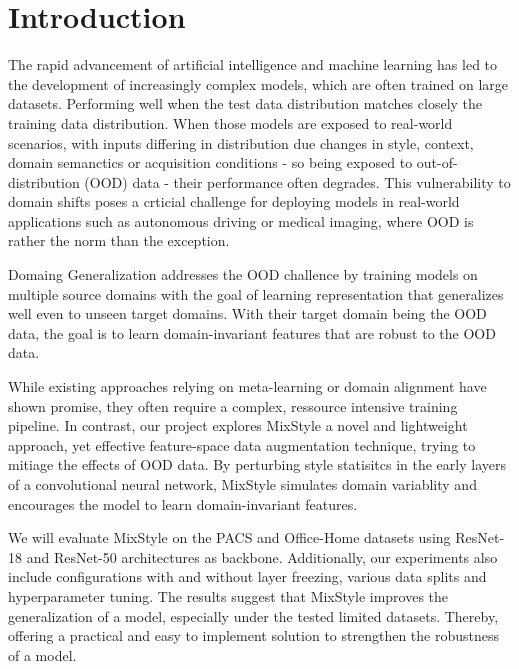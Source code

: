\section{Introduction}

The rapid advancement of artificial intelligence and machine learning has led to the development of increasingly complex models, which are often trained on large datasets. Performing well when the test data distribution matches closely the training data distribution. When those models are exposed to real-world scenarios, with inputs differing in distribution due changes in style, context, domain semanctics or acquisition conditions - so being exposed to out-of-distribution (OOD) data - their performance often degrades. This vulnerability to domain shifts poses a crticial challenge for deploying models in real-world applications such as autonomous driving or medical imaging, where OOD is rather the norm than the exception.

Domaing Generalization addresses the OOD challence by training models on multiple source domains with the goal of learning representation that generalizes well even to unseen target domains. With their target domain being the OOD data, the goal is to learn domain-invariant features that are robust to the OOD data.

While existing approaches relying on meta-learning or domain alignment have shown promise, they often require a complex, ressource intensive training pipeline. In contrast, our project explores MixStyle \citep{zhouMixStyleNeuralNetworks2023} a novel and lightweight approach, yet effective feature-space data augmentation technique, trying to mitiage the effects of OOD data. By perturbing style statisitcs in the early layers of a convolutional neural network, MixStyle simulates domain variablity and encourages the model to learn domain-invariant features.

We will evaluate MixStyle on the PACS and Office-Home datasets using ResNet-18 and ResNet-50 architectures as backbone. Additionally, our experiments also include configurations with and without layer freezing, various data splits and hyperparameter tuning. The results suggest that MixStyle improves the generalization of a model, especially under the tested limited datasets. Thereby, offering a practical and easy to implement solution to strengthen the robustness of a model.